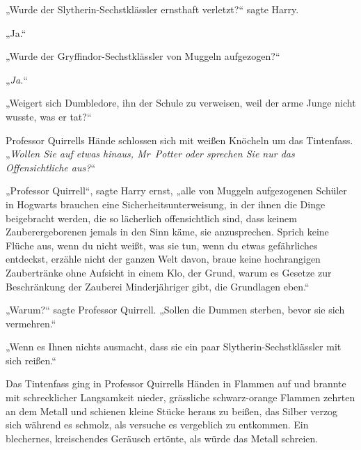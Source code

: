 „Wurde der Slytherin-Sechstklässler ernsthaft verletzt?“ sagte Harry.

„Ja.“

„Wurde der Gryffindor-Sechstklässler von Muggeln aufgezogen?“

„\emph{Ja.}“

„Weigert sich Dumbledore, ihn der Schule zu verweisen, weil der arme Junge nicht wusste, was er tat?“

Professor Quirrells Hände schlossen sich mit weißen Knöcheln um das Tintenfass. „\emph{Wollen Sie auf etwas hinaus, Mr~Potter oder sprechen Sie nur das} \emph{Offensichtliche aus?}“

„Professor Quirrell“, sagte Harry ernst, „alle von Muggeln aufgezogenen Schüler in Hogwarts brauchen eine Sicherheitsunterweisung, in der ihnen die Dinge beigebracht werden, die so lächerlich offensichtlich sind, dass keinem Zauberergeborenen jemals in den Sinn käme, sie anzusprechen. Sprich keine Flüche aus, wenn du nicht weißt, was sie tun, wenn du etwas gefährliches entdeckst, erzähle nicht der ganzen Welt davon, braue keine hochrangigen Zaubertränke ohne Aufsicht in einem Klo, der Grund, warum es Gesetze zur Beschränkung der Zauberei Minderjähriger gibt, die Grundlagen eben.“

„Warum?“ sagte Professor Quirrell. „Sollen die Dummen sterben, bevor sie sich vermehren.“

„Wenn es Ihnen nichts ausmacht, dass sie ein paar Slytherin-Sechstklässler mit sich reißen.“

Das Tintenfass ging in Professor Quirrells Händen in Flammen auf und brannte mit schrecklicher Langsamkeit nieder, grässliche schwarz-orange Flammen zehrten an dem Metall und schienen kleine Stücke heraus zu beißen, das Silber verzog sich während es schmolz, als versuche es vergeblich zu entkommen. Ein blechernes, kreischendes Geräusch ertönte, als würde das Metall schreien.

